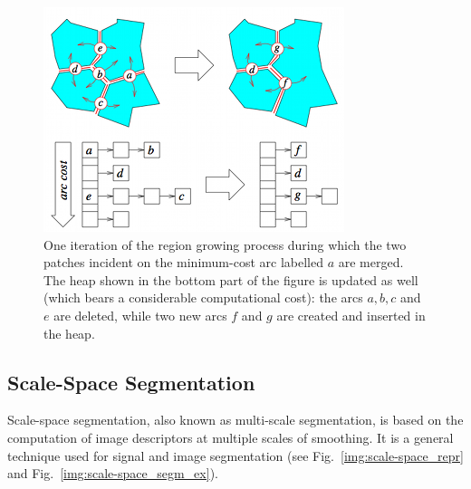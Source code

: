 \begin{figure}
\centering
\includegraphics{figures/region_growing}
\caption[Region growing]{One iteration of the region growing process during which the two patches incident on the minimum-cost arc labelled $a$ are merged. The heap shown in the bottom part of the figure is updated as well (which bears a considerable computational cost): the arcs $a, b, c$ and $e$ are deleted, while two new arcs $f$ and $g$ are created and inserted in the heap.}
\label{img:region_growing}
\end{figure}


\subsection{Scale-Space Segmentation}

Scale-space segmentation, also known as multi-scale segmentation, is based on the computation of image descriptors at multiple scales of smoothing. It is a general technique used for signal and image segmentation (see Fig.~\ref{img:scale-space_repr} and Fig.~\ref{img:scale-space_segm_ex}).

